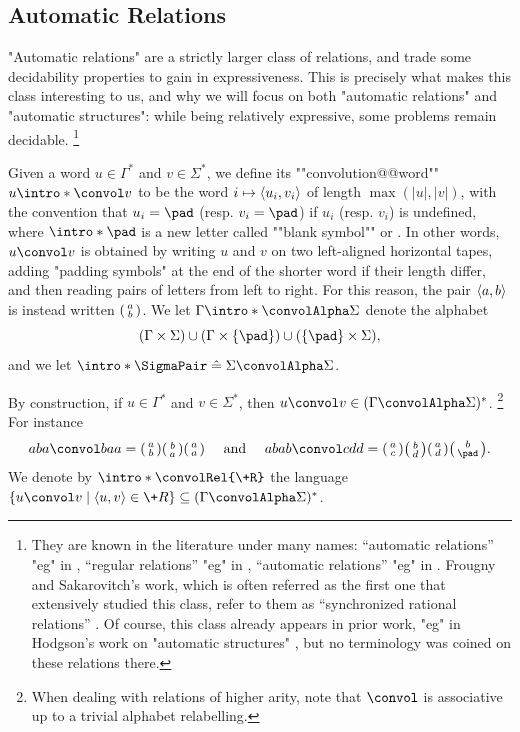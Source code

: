 \subsection{Automatic Relations}

"Automatic relations" are a strictly larger class of relations,
and trade some decidability properties to gain in expressiveness.
This is precisely what makes this class interesting to us, and why we will focus
on both "automatic relations" and "automatic structures": while being relatively
expressive, some problems remain decidable.%
\footnote{They are known in the literature under many names:
``automatic relations''
	"eg" in \cite[Definition~2.3]{CartonChoffrutGrigorieff2006DecisionProblems},
``regular relations''
	"eg" in \cite[Definition~2.2]{KhoussainovNerode1995AutomaticPresentations},
``automatic relations''
	"eg" in \cite[\S~2.1]{LodingSpinrath2019DecisionProblems}.
Frougny and Sakarovitch's work, which is often referred as the first one
that extensively studied this class, refer to them as ``synchronized rational relations''
\cite[\S~4]{FrougnySakarovitch1993SynchronizedRationalRelations}.
Of course, this class already appears in prior work, "eg" in Hodgson's work on
"automatic structures" \cite{Hodgson1983Decidabilite}, but no terminology was coined on these relations there.}

Given a word $u \in \Gamma^*$ and $v\in \Sigma^*$, we define
its \AP""convolution@@word"" $u \intro*\convol v$ to be the word
$i \mapsto \langle u_i, v_i\rangle$ of length $\max{(|u|,|v|)}$,
with the convention that $u_i = \pad$ (resp. $v_i = \pad$)
if $u_i$ (resp. $v_i$) is undefined, where $\intro*\pad$ is a new letter called
""blank symbol"" or . In other words,
$u \convol v$ is obtained by writing $u$ and $v$ on two left-aligned horizontal tapes,
adding "padding symbols" at the end of the shorter word if their length differ,
and then reading pairs of letters from left to right.
For this reason, the pair $\langle a,b\rangle$ is instead written $\pair{a}{b}$.
We let \AP$\Gamma \intro*\convolAlpha \Sigma$ denote the alphabet
\[(\Gamma \times \Sigma) \cup (\Gamma \times \{\pad\}) \cup (\{\pad\} \times \Sigma),\]
and we let $\intro*\SigmaPair \defeq \Sigma \convolAlpha \Sigma$.

By construction, if $u \in \Gamma^*$ and $v\in \Sigma^*$, then $u\convol v \in (\Gamma\convolAlpha\Sigma)^*$.%
\footnote{When dealing with relations of higher arity, note that $\convol$ is associative up to a trivial
alphabet relabelling.}
For instance
\[
	aba \convol baa = \pair{a}{b}\pair{b}{a}\pair{a}{a}
	\quad\text{ and }\quad
	abab \convol cdd = \pair{a}{c}\pair{b}{d}\pair{a}{d}\pair{b}{\pad}.
\]
We denote by \AP$\intro*\convolRel{\+R}$ the language
$\{ u \convol v \mid \tup{u,v} \in \+R\} \subseteq (\Gamma\convolAlpha\Sigma)^*$.

